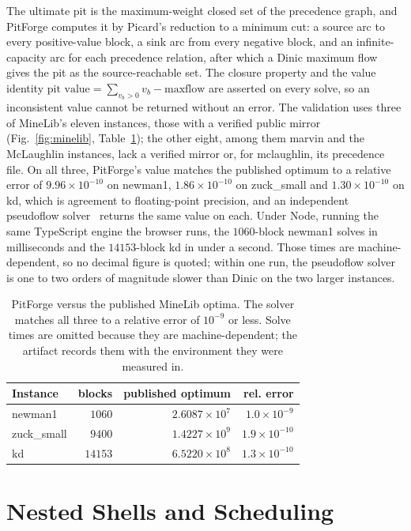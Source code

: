 \documentclass[journal]{IEEEtran}
\begin{document}
The ultimate pit is the maximum-weight closed set of the precedence graph, and PitForge computes it by Picard's
reduction to a minimum cut: a source arc to every positive-value block, a sink arc from every negative block, and
an infinite-capacity arc for each precedence relation, after which a Dinic maximum flow~\cite{dinic} gives the pit
as the source-reachable set. The closure property and the value identity
$\text{pit value} = \sum_{v_b>0} v_b - \text{maxflow}$ are asserted on every solve, so an inconsistent value
cannot be returned without an error. The validation uses three of MineLib's eleven instances, those with a verified
public mirror (Fig.~\ref{fig:minelib}, Table~\ref{tab:minelib}); the other eight, among them marvin and the
McLaughlin instances, lack a verified mirror or, for mclaughlin, its precedence file. On all three, PitForge's value matches the published optimum to a relative error of
$9.96\times10^{-10}$ on newman1, $1.86\times10^{-10}$ on zuck\_small and $1.30\times10^{-10}$ on kd, which is
agreement to floating-point precision, and an independent pseudoflow solver~\cite{hochbaum} returns the same value on
each. Under Node, running the same TypeScript engine the browser runs, the $1060$-block newman1 solves in
milliseconds and the $14153$-block kd in under a second. Those times are machine-dependent, so no decimal figure is
quoted; within one run, the pseudoflow solver is one to two orders of magnitude slower than Dinic on the two larger
instances.

\begin{table}[!t]
\centering
\caption{PitForge versus the published MineLib optima. The solver matches all three to a relative error of
$10^{-9}$ or less. Solve times are omitted because they are machine-dependent; the artifact records them with the
environment they were measured in.}
\label{tab:minelib}
\footnotesize
\begin{tabular}{@{}l r r r@{}}
\toprule
Instance & blocks & published optimum & rel. error \\
\midrule
newman1    & $1060$  & $2.6087\times10^{7}$ & $1.0\times10^{-9}$ \\
zuck\_small & $9400$  & $1.4227\times10^{9}$ & $1.9\times10^{-10}$ \\
kd         & $14153$ & $6.5220\times10^{8}$ & $1.3\times10^{-10}$ \\
\bottomrule
\end{tabular}
\end{table}

\section{Nested Shells and Scheduling}\label{sec:whittle}
\end{document}
